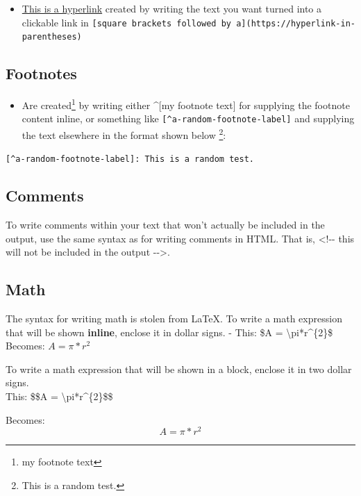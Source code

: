 \documentclass[a4paper, nobind]{templates/ociamthesis}
\providecommand{\tightlist}{%
  \setlength{\itemsep}{0pt}\setlength{\parskip}{0pt}}
\begin{document}
\begin{itemize}
\tightlist
\item
  \href{https://www.google.com}{This is a hyperlink} created by writing the text you want turned into a clickable link in \texttt{{[}square\ brackets\ followed\ by\ a{]}(https://hyperlink-in-parentheses)}
\end{itemize}

\hypertarget{footnotes}{%
\subsection{Footnotes}\label{footnotes}}

\begin{itemize}
\tightlist
\item
  Are created\footnote{my footnote text} by writing either \^{}{[}my footnote text{]} for supplying the footnote content inline, or something like \texttt{{[}\^{}a-random-footnote-label{]}} and supplying the text elsewhere in the format shown below \footnote{This is a random test.}:
\end{itemize}

\texttt{{[}\^{}a-random-footnote-label{]}:\ This\ is\ a\ random\ test.}

\hypertarget{comments}{%
\subsection{Comments}\label{comments}}

To write comments within your text that won't actually be included in the output, use the same syntax as for writing comments in HTML. That is, \textless!-\/- this will not be included in the output -\/-\textgreater.

\hypertarget{math}{%
\subsection{Math}\label{math}}

The syntax for writing math is stolen from LaTeX. To write a math expression that will be shown \textbf{inline}, enclose it in dollar signs.
- This: \$A = \textbackslash pi*r\^{}\{2\}\$ Becomes: \(A = \pi*r^{2}\)

To write a math expression that will be shown in a block, enclose it in two dollar signs.\\
This: \$\$A = \textbackslash pi*r\^{}\{2\}\$\$

Becomes:
\[A = \pi*r^{2}\]
\end{document}
